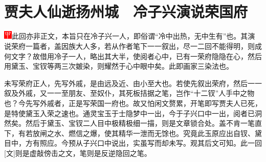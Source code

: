 \chapter{贾夫人仙逝扬州城　冷子兴演说荣国府}\label{part0006_split_000.htmlux5cux23calibre_pb_0}

\includegraphics[width=4mm]{../Images/00002}{\kaishu 此回亦非正文，本旨只在冷子兴一人，即俗谓``冷中出热，无中生有''也。其演说荣府一篇者，盖因族大人多，若从作者笔下一一叙出，尽一二回不能得明，则成何文字？故借用冷子一人，略出其大半，使阅者心中，已有一荣府隐隐在心，然后用黛玉、宝钗等两三次皴染，则耀然于心中眼中矣。此即画家三染法也。}%


{\kaishu 未写荣府正人，先写外戚，是由远及近、由小至大也。若使先叙出荣府，然后一一叙及外戚，又一一至朋友、至奴仆，其死板拮据之笔，岂作``十二钗''人手中之物也？今先写外戚者，正是写荣国一府也。故又怕闲文赘累，开笔即写贾夫人已死，是特使黛玉入荣之速也。通灵宝玉于士隐梦中一出，今于子兴口中一出，阅者已洞然矣。然后于黛玉、宝钗二人目中极精极细一描，则是文章锁合处。盖不肯一笔直下，有若放闸之水、燃信之爆，使其精华一泄而无馀也。究竟此玉原应出自钗、黛目中，方有照应。今预从子兴口中说出，实虽写而却未写。观其后文可知。此一回{[}文{]}则是虚敲傍击之文，笔则是反逆隐回之笔。}

